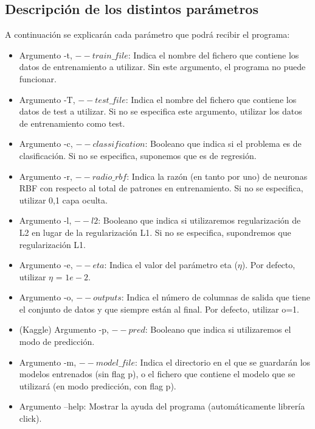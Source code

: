 \subsection{Descripción de los distintos parámetros}
A continuación se explicarán cada parámetro que podrá recibir el programa:
\begin{itemize}
	\item Argumento -t, $--train\_file$: Indica el nombre del fichero que contiene los datos de entrenamiento a utilizar. Sin este argumento, el programa no puede funcionar.
	
	\item Argumento -T, $--test\_file$: Indica el nombre del fichero que contiene los datos de test a utilizar. Si no se especifica este argumento, utilizar los datos de entrenamiento como test.
	
	\item Argumento -c, $--classification$: Booleano que indica si el problema es de clasificación. Si no se especifica, suponemos que es de regresión.
	
	\item Argumento -r, $--radio\_rbf$: Indica la razón (en tanto por uno) de neuronas RBF con respecto al total de patrones en entrenamiento. Si no se especifica, utilizar 0,1 capa oculta.
	
	\item Argumento -l, $--l2$: Booleano que indica si utilizaremos regularización de L2 en lugar de la regularización L1. Si no se especifica, supondremos que regularización L1.
	
	\item Argumento -e, $--eta$: Indica el valor del parámetro eta ($\eta$). Por defecto, utilizar $\eta$ = $1e-2$.
	
	\item Argumento -o, $--outputs$: Indica el número de columnas de salida que tiene el conjunto de datos y que siempre están al final. Por defecto, utilizar o=1.
	
	\item (Kaggle) Argumento -p, $--pred$: Booleano que indica si utilizaremos el modo de predicción.
	
	\item Argumento -m, $--model\_file$: Indica el directorio en el que se guardarán los modelos entrenados (sin flag p), o el fichero que contiene el modelo que se utilizará (en modo predicción, con flag p).
	
	\item Argumento --help: Mostrar la ayuda del programa (automáticamente librería click).
\end{itemize}


